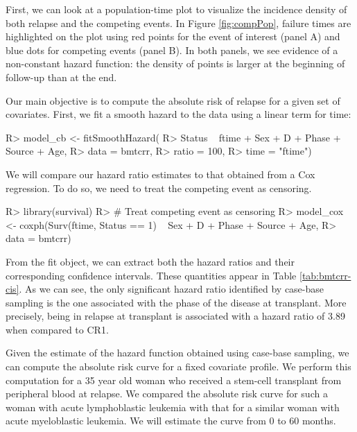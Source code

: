 \documentclass[
]{jss}
\begin{document}
First, we can look at a population-time plot to visualize the incidence
density of both relapse and the competing events. In Figure
\ref{fig:compPop}, failure times are highlighted on the plot using red
points for the event of interest (panel A) and blue dots for competing
events (panel B). In both panels, we see evidence of a non-constant
hazard function: the density of points is larger at the beginning of
follow-up than at the end.

Our main objective is to compute the absolute risk of relapse for a
given set of covariates. First, we fit a smooth hazard to the data using
a linear term for time:

\begin{CodeChunk}

\begin{CodeInput}
R> model_cb <- fitSmoothHazard(
R>     Status ~ ftime + Sex + D + Phase + Source + Age, 
R>     data = bmtcrr, 
R>     ratio = 100, 
R>     time = "ftime")
\end{CodeInput}
\end{CodeChunk}

We will compare our hazard ratio estimates to that obtained from a Cox
regression. To do so, we need to treat the competing event as censoring.

\begin{CodeChunk}

\begin{CodeInput}
R> library(survival)
R> # Treat competing event as censoring
R> model_cox <- coxph(Surv(ftime, Status == 1) ~ Sex + D + Phase + Source + Age,
R>                    data = bmtcrr)
\end{CodeInput}
\end{CodeChunk}

From the fit object, we can extract both the hazard ratios and their
corresponding confidence intervals. These quantities appear in Table
\ref{tab:bmtcrr-cis}. As we can see, the only significant hazard ratio
identified by case-base sampling is the one associated with the phase of
the disease at transplant. More precisely, being in relapse at
transplant is associated with a hazard ratio of 3.89 when compared to
CR1.

Given the estimate of the hazard function obtained using case-base
sampling, we can compute the absolute risk curve for a fixed covariate
profile. We perform this computation for a 35 year old woman who
received a stem-cell transplant from peripheral blood at relapse. We
compared the absolute risk curve for such a woman with acute
lymphoblastic leukemia with that for a similar woman with acute
myeloblastic leukemia. We will estimate the curve from 0 to 60 months.
\end{document}
